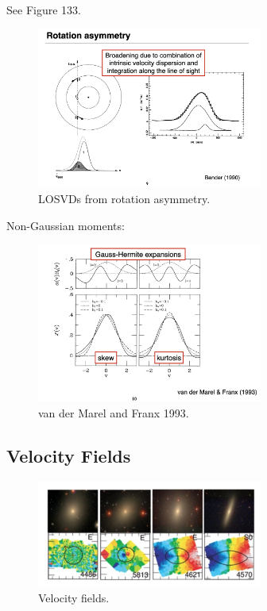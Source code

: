 \documentclass{article}
\begin{document}
See Figure 133.

\begin{figure}
    \centering
    \includegraphics[width=0.66\textwidth]{figs/Screen Shot 2021-10-20 at 10.18.48 AM.png}
    \caption{LOSVDs from rotation asymmetry.}
    \label{fig:asymmetry_rot2}
\end{figure}

Non-Gaussian moments:

\begin{figure}
    \centering
    \includegraphics[width=0.66\textwidth]{figs/Screen Shot 2021-10-20 at 10.21.09 AM.png}
    \caption{van der Marel and Franx 1993.}
    \label{fig:asymmetry_rot}
\end{figure}

\subsection{Velocity Fields}

\begin{figure}
    \centering
    \includegraphics[width=0.66\textwidth]{figs/Screen Shot 2021-10-20 at 10.25.31 AM.png}
    \caption{Velocity fields.}
    \label{fig:vel_fields}
\end{figure}
\end{document}
